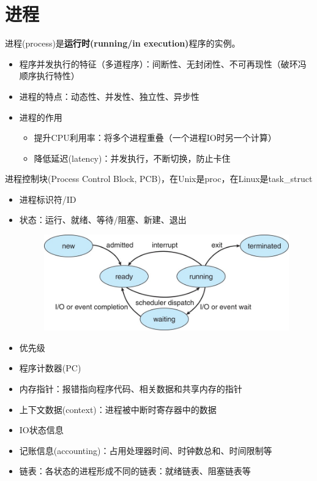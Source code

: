 
\section{进程}
进程(process)是\textbf{运行时(running/in execution)}程序的实例。
\begin{itemize}
	\item 程序并发执行的特征（多道程序）：间断性、无封闭性、不可再现性（破环冯顺序执行特性）
	\item 进程的特点：动态性、并发性、独立性、异步性
	\item 进程的作用
	\begin{itemize}
		\item 提升CPU利用率：将多个进程重叠（一个进程IO时另一个计算）
		\item 降低延迟(latency)：并发执行，不断切换，防止卡住
	\end{itemize}
\end{itemize}

进程控制块(Process Control Block, PCB)，在Unix是proc，在Linux是task\_struct
\begin{itemize}
	\item 进程标识符/ID
	\item 状态：运行、就绪、等待/阻塞、新建、退出
	\begin{figure}[H]
	\centering
	\includegraphics[width=0.6\linewidth]{fig/5-state-process-model.jpg}
	\end{figure}
	\item 优先级
	\item 程序计数器(PC)
	\item 内存指针：报错指向程序代码、相关数据和共享内存的指针
	\item 上下文数据(context)：进程被中断时寄存器中的数据
	\item IO状态信息
	\item 记账信息(accounting)：占用处理器时间、时钟数总和、时间限制等
	\item 链表：各状态的进程形成不同的链表：就绪链表、阻塞链表等
\end{itemize}


